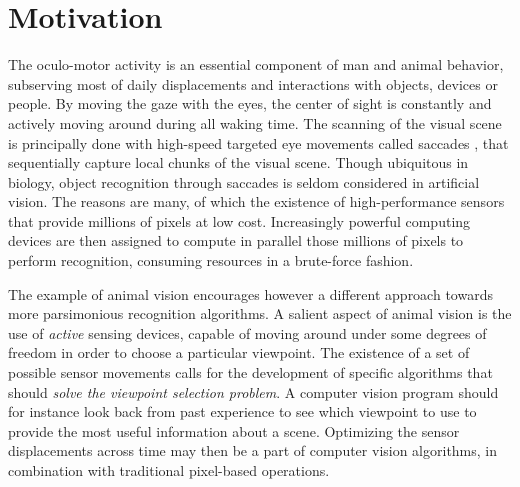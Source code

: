 \documentclass{article}
\begin{document}
\section{Motivation}

The oculo-motor activity is an essential component of man and animal behavior, subserving most of daily displacements and interactions with objects, devices or people. By moving the gaze with the eyes, the center of sight is constantly and actively moving around during all waking time.  %
The scanning of the visual scene is principally done with high-speed targeted eye movements called saccades \cite{yarbus1967eye}, that sequentially capture local chunks of the visual scene. 
Though ubiquitous in biology, object recognition through saccades is seldom considered in artificial vision. The reasons are many, of which the existence of high-performance sensors that provide millions of pixels at low cost. %
Increasingly powerful computing devices are then assigned to compute in parallel those millions of pixels to perform recognition, consuming resources in a brute-force fashion. 

The example of animal vision encourages however a different approach towards more parsimonious recognition algorithms. A salient aspect of animal vision is the use of \emph{active} sensing devices, capable of moving around under some degrees of freedom in order to choose a particular viewpoint. The existence of a set of possible sensor movements calls for the development of specific algorithms that should \emph{solve the viewpoint selection problem}. A computer vision program should for instance look back from past experience to see which viewpoint to use to provide the most useful information about a scene. Optimizing the sensor displacements across time may then be a part of computer vision algorithms, in combination with traditional pixel-based operations. 
\end{document}
